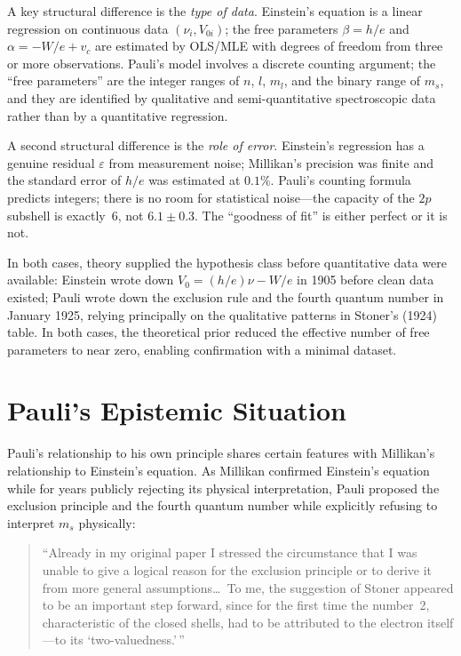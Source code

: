 \documentclass[12pt]{article}
\begin{document}
A key structural difference is the \emph{type of data}.  Einstein's equation
is a linear regression on continuous data $(\nu_i, V_{0i})$; the free
parameters $\beta = h/e$ and $\alpha = -W/e + v_c$ are estimated by
OLS/MLE with degrees of freedom from three or more observations.  Pauli's
model involves a discrete counting argument; the ``free parameters'' are the
integer ranges of $n$, $l$, $m_l$, and the binary range of $m_s$, and they
are identified by qualitative and semi-quantitative spectroscopic data rather
than by a quantitative regression.

A second structural difference is the \emph{role of error}.  Einstein's
regression has a genuine residual $\varepsilon$ from measurement noise;
Millikan's precision was finite and the standard error of $h/e$ was
estimated at $0.1\%$.  Pauli's counting formula predicts integers; there is
no room for statistical noise---the capacity of the $2p$ subshell is exactly~6,
not $6.1 \pm 0.3$.  The ``goodness of fit'' is either perfect or it is not.

In both cases, theory supplied the hypothesis class before quantitative
data were available: Einstein wrote down $V_0 = (h/e)\nu - W/e$ in 1905
before clean data existed; Pauli wrote down the exclusion rule and the
fourth quantum number in January 1925, relying principally on the qualitative
patterns in Stoner's (1924) table.  In both cases, the theoretical prior
reduced the effective number of free parameters to near zero, enabling
confirmation with a minimal dataset.

\section{Pauli's Epistemic Situation}

Pauli's relationship to his own principle shares certain features with
Millikan's relationship to Einstein's equation.  As Millikan confirmed
Einstein's equation while for years publicly rejecting its physical
interpretation, Pauli proposed the exclusion principle and the fourth quantum
number while explicitly refusing to interpret $m_s$ physically:

\begin{quote}
  ``Already in my original paper I stressed the circumstance that I was
  unable to give a logical reason for the exclusion principle or to derive
  it from more general assumptions\ldots\ To me, the suggestion of Stoner
  appeared to be an important step forward, since for the first time the
  number~2, characteristic of the closed shells, had to be attributed to the
  electron itself---to its `two-valuedness.'\,'' \citep{Pauli1946Nobel}
\end{quote}
\end{document}

